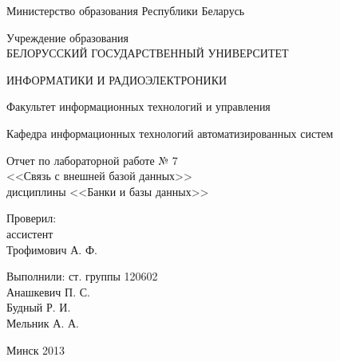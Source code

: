 \thispagestyle{empty}

\begin{center}
Министерство образования Республики Беларусь\par
\vspace{2mm}
Учреждение образования \\
БЕЛОРУССКИЙ ГОСУДАРСТВЕННЫЙ УНИВЕРСИТЕТ\par
ИНФОРМАТИКИ И РАДИОЭЛЕКТРОНИКИ\par 
\vspace{2mm}
Факультет информационных технологий и управления\par
\vspace{2mm}
Кафедра информационных технологий автоматизированных систем\par

\end{center}

\vspace{50mm}

\begin{center}
  Отчет по лабораторной работе № 7\\
  <<Связь с внешней базой данных>> \\
  дисциплины <<Банки и базы данных>>
\end{center}

\vspace{40mm}

\begin{multicols}{2}
\begin{flushleft}
  Проверил: \\
  ассистент \\
  Трофимович А. Ф.
\end{flushleft}

\begin{flushright}
  Выполнили: ст. группы 120602 \\
  Анашкевич П. С. \\
  Будный Р. И. \\
  Мельник А. А. \\
\end{flushright}
\end{multicols}

\vspace{40mm}
\begin{center}
Минск 2013
\end{center}

\newpage
